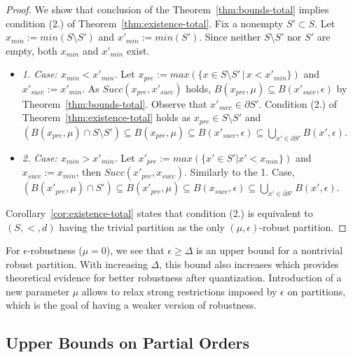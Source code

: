 \begin{proof}
   We show that conclusion of the Theorem~\ref{thm:bounds-total} implies condition (2.) of Theorem~\ref{thm:existence-total}. 
   Fix a nonempty $S' \subset S$. 
   Let $x_{min} := min(S \setminus S')$ and $x'_{min} := min(S')$.
   Since neither $S \setminus S'$ nor $S'$ are empty, both $x_{min}$ and $x'_{min}$ exist.
   \begin{itemize}
       \item \textit{1. Case: $x_{min} < x'_{min}$.}
                   Let $x_{pre} := max(\{x \in S \setminus S'\,|\, x < x'_{min}\})$ and $x'_{succ} := x'_{min}$.
                   As $Succ(x_{pre}, x'_{succ})$ holds, $B(x_{pre}, \mu) \subseteq B(x'_{succ}, \epsilon)$ by Theorem~\ref{thm:bounds-total}. 
                   Observe that $x'_{succ} \in \partial S'$. 
                   Condition (2.) of Theorem~\ref{thm:existence-total} holds as $x_{pre} \in S \setminus S'$ and $(B(x_{pre}, \mu) \cap S \setminus S') \subseteq B(x_{pre}, \mu) \subseteq B(x'_{succ}, \epsilon) \subseteq \bigcup_{x' \in \partial S'} B(x', \epsilon)$.
        \item \textit{2. Case: $x_{min} > x'_{min}$.}
                   Let $x'_{pre} := max(\{x' \in S'| x' < x_{min}\})$ and $x_{succ} := x_{min}$, then $Succ(x'_{pre}, x_{succ})$. 
                   Similarly to the 1. Case, $(B(x'_{pre}, \mu) \cap S') \subseteq B(x'_{pre}, \mu) \subseteq B(x_{succ}, \epsilon) \subseteq \bigcup_{x' \in \overline{\partial} S'} B(x', \epsilon)$.
   \end{itemize}
   Corollary~\ref{cor:existence-total} states that condition (2.) is equivalent to $(S,<,d)$ having the trivial partition as the only $(\mu, \epsilon)$-robust partition.
\end{proof}

For $\epsilon$-robustness ($\mu=0$), we see that $\epsilon \geq \Delta$ is an upper bound for a nontrivial robust partition. With increasing $\Delta$, this bound also increases which provides theoretical evidence for better robustness after quantization. Introduction of a new parameter $\mu$ allows to relax strong restrictions imposed by $\epsilon$ on partitions, which is the goal of having a weaker version of robustness. 

\subsection{Upper Bounds on Partial Orders}
\label{subsec:bounds-partial}

